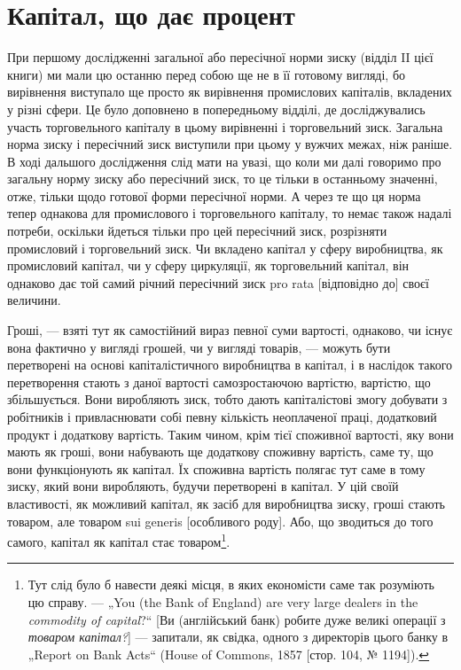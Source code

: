

\section{Капітал, що дає процент}

При першому дослідженні загальної або пересічної норми
зиску (відділ II цієї книги) ми мали цю останню перед собою
ще не в її готовому вигляді, бо вирівнення виступало ще просто
як вирівнення промислових капіталів, вкладених у різні сфери.
Це було доповнено в попередньому відділі, де досліджувались
участь торговельного капіталу в цьому вирівненні і торговельний
зиск. Загальна норма зиску і пересічний зиск виступили
при цьому у вужчих межах, ніж раніше. В ході дальшого
дослідження слід мати на увазі, що коли ми далі говоримо
про загальну норму зиску або пересічний зиск, то це тільки
в останньому значенні, отже, тільки щодо готової форми пересічної
норми. А через те що ця норма тепер однакова для промислового
і торговельного капіталу, то немає також надалі
потреби, оскільки йдеться тільки про цей пересічний зиск,
розрізняти промисловий і торговельний зиск. Чи вкладено капітал
у сферу виробництва, як промисловий капітал, чи у сферу циркуляції,
як торговельний капітал, він однаково дає той самий
річний пересічний зиск pro rata [відповідно до] своєї величини.

Гроші, — взяті тут як самостійний вираз певної суми вартості,
однаково, чи існує вона фактично у вигляді грошей, чи у
вигляді товарів, — можуть бути перетворені на основі капіталістичного
виробництва в капітал, і в наслідок такого перетворення
стають з даної вартості самозростаючою вартістю, вартістю,
що збільшується. Вони виробляють зиск, тобто дають
капіталістові змогу добувати з робітників і привласнювати собі
певну кількість неоплаченої праці, додатковий продукт і додаткову
вартість. Таким чином, крім тієї споживної вартості, яку
вони мають як гроші, вони набувають ще додаткову споживну
вартість, саме ту, що вони функціонують як капітал. Їх споживна
вартість полягає тут саме в тому зиску, який вони виробляють,
будучи перетворені в капітал. У цій своїй властивості,
як можливий капітал, як засіб для виробництва зиску, гроші
стають товаром, але товаром sui generis [особливого роду].
Або, що зводиться до того самого, капітал як капітал стає
товаром\footnote{
Тут слід було б навести деякі місця, в яких економісти саме так розуміють
цю справу. — „You (the Bank of England) are very large dealers in the
\emph{commodity of capital}?“ [Ви (англійський банк) робите дуже великі операції
з \emph{товаром капітал?}] — запитали, як свідка, одного з директорів цього банку
в „Report on Bank Acts“ (House of Commons, 1857 [стор. 104, № 1194]).
}.

